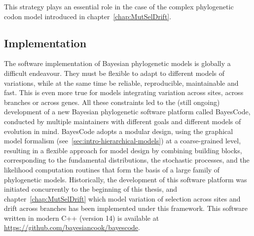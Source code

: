This strategy plays an essential role in the case of the complex phylogenetic codon model introduced in chapter~\ref{chap:MutSelDrift}.

\subsection{Implementation}
\label{subsec:implementation}

The software implementation of Bayesian phylogenetic models is globally a difficult endeavour.
They must be flexible to adapt to different models of variations, while at the same time be reliable, reproducible, maintainable and fast.
This is even more true for models integrating variation across sites, across branches or across genes.
All these constraints led to the (still ongoing) development of a new Bayesian phylogenetic software platform called BayesCode, conducted by multiple maintainers with different goals and different models of evolution in mind.
BayesCode adopts a modular design, using the graphical model formalism (see~\ref{sec:intro-hierarchical-models}) at a coarse-grained level, resulting in a flexible approach for model design by combining building blocks, corresponding to the fundamental distributions, the stochastic processes, and the likelihood computation routines that form the basis of a large family of phylogenetic models.
Historically, the development of this software platform was initiated concurrently to the beginning of this thesis, and chapter~\ref{chap:MutSelDrift} which model variation of selection across sites and drift across branches has been implemented under this framework.
This software written in modern C++ (version 14) is available at \url{https://github.com/bayesiancook/bayescode}.
